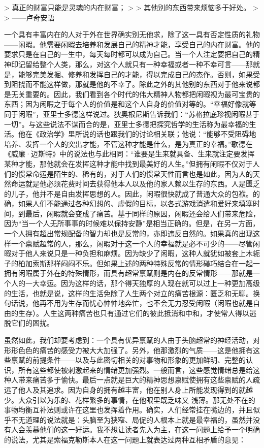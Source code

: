 \documentclass[12pt,oneside]{book}
\begin{document}
 

> 真正的财富只能是灵魂的内在财富； 
>
> 其他别的东西带来烦恼多于好处。 
>
> ——卢奇安语 

 

一个具有丰富内在的人对于外在世界确实别无他求，除了这一具有否定性质的礼物——闲暇。他需要闲暇去培养和发展自己的精神才能，享受自己的内在财富。他的要求只是在自己的一生中，每天每时都可以成为自己。当一个人注定要把自己的精神印记留给整个人类，那么，对这个人就只有一种幸福或者一种不幸可言——那就是，能够完美发掘、修养和发挥自己的才能，得以完成自己的杰作。否则，如果受到阻挠而不能这样做，那就是他的不幸了。除此之外的其他别的东西对于他来说都是无关重要的。因此，我们看到各个时代的伟大精神人物都把闲暇视为最可宝贵的东西；因为闲暇之于每个人的价值是和这个人自身的价值对等的。“幸福好像就等同于闲暇”，亚里士多德这样说过。狄奥根尼斯告诉我们：“苏格拉底珍视闲暇甚于一切”。与这些说法不谋而合的是，亚里士多德把探究哲学的生活称为最幸福的生活。他在《政治学》里所说的话也跟我们的讨论相关联；他说：“能够不受阻碍地培养、发挥一个人的突出才能，不管这种才能是什么，是为真正的幸福。”歌德在《威廉·迈斯特》中的说法也与此相同：“谁要是生来就具备、生来就注定要发挥某种才能，那他就会在发挥这种才能中找到最美好的人生。”但拥有闲暇不仅对于人们的惯常命运是陌生的、稀有的，对于人们的惯常天性而言也是如此，因为人的天然命运就是他必须花费时间去获得他本人以及他的家人赖以生存的东西。人是匮乏的儿子，他并不是自由发挥思想的人。因此，闲暇很快就成了普通大众的包袱。的确，如果人们不能通过各种幻想的、虚假的目标，以各式游戏消遣和爱好来填塞时间，到最后，闲暇就会变成了痛苦。基于同样的原因，闲暇还会给人们带来危险，因为“当一个人无所事事的时候难以保持安静”是相当正确的。但是，在另一方面，一个人拥有超出常规配备的智力却也是反常的，亦即违反自然的。如果真的出现这样一个禀赋超常的人，那么，闲暇对于这一个人的幸福就是必不可少的——尽管闲暇对于他人来说只是一种负担和麻烦。因为缺少了闲暇，这种人就犹如被套上木轭子的柏加索斯那样闷闷不乐。但如果上述的两种特殊反常的情形碰巧结合在一起一拥有闲暇属于外在的特殊情形，而具有超常禀赋则是内在的反常情形——那就是一个人的一大幸运。因为这样的话，那个得天独厚的人现在就可以过上一种更加高级的生活，也就是说，这样的生活免除了人生两个对立的痛苦根源：匮乏和无聊。换句话说，他再不用为生存而忧心忡忡地奔忙，也不会无力忍受闲暇（闲暇也就是自由的生存）。人生这两种痛苦也只有通过它们的彼此抵消和中和，才使常人得以逃脱它们的困扰。 

虽然如此，我们却要考虑到：一个具有优异禀赋的人由于头脑超常的神经活动，对形形色色的痛苦的感受力被大大加强了。另外，他那激烈的气质——这是他拥有这些禀赋的前提条件——以及与此密切相关的对事物和形象的更加鲜明、完整的认识，所有这些都使被刺激起来的情绪更加强烈。一般而言，这些感觉情绪总是给这种人带来痛苦多于愉快。最后一点就是巨大的精神思想禀赋使拥有这些禀赋的人疏远了他人及其追求。因为自身的拥有越丰富，他在别人身上所能发现得到的就越少。大众引以为乐的、花样繁多的事情，在他眼里既乏味又
浅薄。那无处不在的事物均衡互补法则或许在这里也发挥着作用。确实，人们经常挂在嘴边的，并且似乎不无道理的说法就是：头脑至为狭窄、局促的人根本上就是最幸福的，虽然并没有人会羡慕他们的这一好运。我不想让读者先入为主，在这一问题上给予一个明确的说法，尤其是索福克勒斯本人在这一问题上就表达过两种互相矛盾的意见： 
\end{document}
